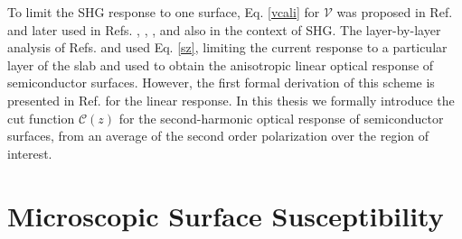 To limit the SHG response to one surface, Eq. \eqref{vcali} for
$\boldsymbol{\mathcal{V}}$ was proposed in Ref. \cite{reiningPRB94} and later
used in Refs. \cite{mendozaPRL98}, \cite{mendozaPRB01}, \cite{sanoPRB02}, and
\cite{mejiaRMF04} also in the context of SHG. The layer-by-layer analysis of
Refs. \cite{hoganPRB03} and \cite{castilloPRB03} used Eq. \eqref{sz}, limiting
the current response to a particular layer of the slab and used to obtain the
anisotropic linear optical response of semiconductor surfaces. However, the
first formal derivation of this scheme is presented in Ref. \cite{mendozaPRB06}
for the linear response. In this thesis we formally introduce the cut function
$\boldsymbol{\mathcal{C}}(z)$ for the second-harmonic optical response of
semiconductor surfaces, from an average of the second order polarization over
the region of interest.



\section{Microscopic Surface Susceptibility}

